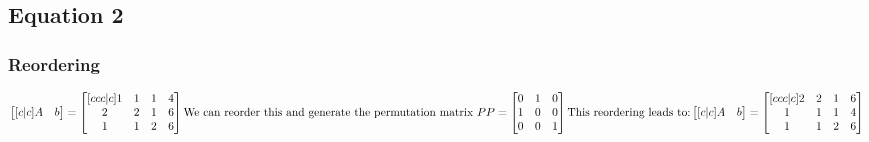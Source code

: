 \documentclass{article}
\begin{document}
\subsection{Equation 2}

\subsubsection{Reordering}
\begin{math}
\begin{bmatrix}[c|c]A&b\end{bmatrix} = \begin{bmatrix}[ccc|c]1&1&1&4\\2&2&1&6\\1&1&2&6\end{bmatrix}\\\\
\text{We can reorder this and generate the permutation matrix }P\\
P = \begin{bmatrix}0&1&0\\1&0&0\\0&0&1\end{bmatrix}\\
\text{This reordering leads to:}\\
\begin{bmatrix}[c|c]A&b\end{bmatrix} = \begin{bmatrix}[ccc|c]2&2&1&6\\1&1&1&4\\1&1&2&6\end{bmatrix}\\\\
\end{math}
\end{document}
